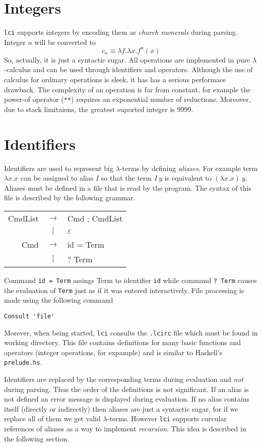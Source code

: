 \documentclass[a4paper,11pt]{article}
\newcommand{\la}{$\lambda$}
\newcommand{\lci}{\texttt{lci}}
\newcommand{\lc}{$\lambda$-calculus}
\newcommand{\kwd}[1]{\texttt{#1}}
\newcommand{\en}[1]{#1}
\begin{document}
\section{Integers}
\lci{} supports integers by encoding them as \emph{church numerals} during
parsing. Integer $n$ will be converted to
\[ c_n \equiv \lambda f.\lambda x.f^n(x) \]
So, actually, it is just a syntactic sugar. All operations are implemented in
pure \lc{} and can be used through identifiers and operators. Although the
use of calculus for ordinary operations is sleek, it has has a serious performace
drawback. The complexity of an operation is far from constant, for example
the power-of operator (\verb+**+) requires an exponential number of reductions.
Moreover, due to stack limitaions, the greatest suported integer is 9999.

\section{Identifiers}
Identifiers are used to represent big \la-terms by defining \emph{aliases}.
For example term $\lambda x.x$ can be assigned to alias $I$ so that the term
$I\ y$ is equivalent to $(\lambda x.x)\ y$. Aliases must be defined in a file
that is read by the program. The syntax of this file is described by the following
grammar.
\begin{center}
	\en{
	\begin{tabular}{rcl}
		CmdList & $\rightarrow$ & Cmd ; CmdList \\
		& $|$ & $\varepsilon$ \\
		Cmd & $\rightarrow$ & id = Term \\
		& $|$ & ? Term
	\end{tabular}
	}
\end{center}
Command \kwd{id = Term} assings Term to identifier \kwd{id} while command
\kwd{? Term} causes the evaluation of \kwd{Term} just as if it was entered interactively.
File processing is made using the following command
\begin{center}
	\verb+Consult 'file'+
\end{center}
Morever, when being started, \lci{} consults the \kwd{.lcirc} file which must be
found in working directory. This file contains definitions for many basic
functions and operators (integer operations, for expample) and is similar
to Haskell's \kwd{prelude.hs}.

Identifiers are replaced by the corresponding terms during evaluation and \emph{not}
during parsing. Thus the order of the definitions is not significant. If an alias
is not defined an error message is displayed during evaluation. If no alias
contains itself (directly or indirectly) then aliases are just a syntactic sugar,
for if we replace all of them we get valid \la-terms. However \lci{} supports
curcular references of aliases as a way to implement \emph{recursion}. This
idea is described in the following section.
\end{document}
